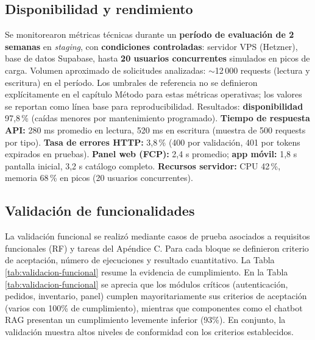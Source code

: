\subsection{Disponibilidad y rendimiento}

Se monitorearon métricas técnicas durante un \textbf{período de evaluación de 2 semanas} en \textit{staging}, con \textbf{condiciones controladas}: servidor VPS (Hetzner), base de datos Supabase, hasta \textbf{20 usuarios concurrentes} simulados en picos de carga. Volumen aproximado de solicitudes analizadas: $\sim$12\,000 requests (lectura y escritura) en el período. Los umbrales de referencia no se definieron explícitamente en el capítulo Método para estas métricas operativas; los valores se reportan como línea base para reproducibilidad. Resultados: \textbf{disponibilidad} 97,8\,\% (caídas menores por mantenimiento programado). \textbf{Tiempo de respuesta API:} 280 ms promedio en lectura, 520 ms en escritura (muestra de 500 requests por tipo). \textbf{Tasa de errores HTTP:} 3,8\,\% (400 por validación, 401 por tokens expirados en pruebas). \textbf{Panel web (FCP):} 2,4 s promedio; \textbf{app móvil:} 1,8 s pantalla inicial, 3,2 s catálogo completo. \textbf{Recursos servidor:} CPU 42\,\%, memoria 68\,\% en picos (20 usuarios concurrentes).

\subsection{Validación de funcionalidades}

La validación funcional se realizó mediante casos de prueba asociados a requisitos funcionales (RF) y tareas del Apéndice C. Para cada bloque se definieron criterio de aceptación, número de ejecuciones y resultado cuantitativo. La Tabla \ref{tab:validacion-funcional} resume la evidencia de cumplimiento.
  En la Tabla \ref{tab:validacion-funcional} se aprecia que los módulos críticos (autenticación, pedidos, inventario, panel) cumplen mayoritariamente sus criterios de aceptación (varios con 100\% de cumplimiento), mientras que componentes como el chatbot RAG presentan un cumplimiento levemente inferior (93\%). En conjunto, la validación muestra altos niveles de conformidad con los criterios establecidos.

